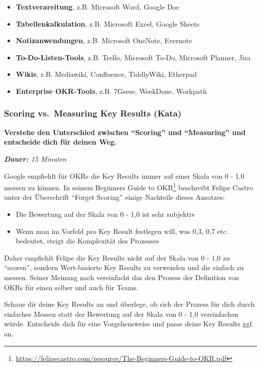 \documentclass[
  ngerman,
  paper=a4,
,captions=tableheading
]{scrartcl}
\DeclareRobustCommand{\href}[2]{#2\footnote{\url{#1}}}
\providecommand{\tightlist}{%
  \setlength{\itemsep}{0pt}\setlength{\parskip}{0pt}}
\begin{document}
\begin{itemize}
\tightlist
\item
  \textbf{Textverareitung}, z.B. Microsoft Word, Google Doc
\item
  \textbf{Tabellenkalkulation}, z.B. Microsoft Excel, Google Sheets
\item
  \textbf{Notizanwendungen}, z.B. Microsoft OneNote, Evernote
\item
  \textbf{To-Do-Listen-Tools}, z.B. Trello, Microsoft To-Do, Microsoft
  Planner, Jira
\item
  \textbf{Wikis}, z.B. Mediawiki, Confluence, TiddlyWiki, Etherpad
\item
  \textbf{Enterprise OKR-Tools}, z.B. 7Geese, WeekDone, Workpath
\end{itemize}

\hypertarget{scoring-vs.-measuring-key-results-kata}{%
\subsubsection{Scoring vs.~Measuring Key Results
(Kata)}\label{scoring-vs.-measuring-key-results-kata}}

\textbf{Verstehe den Unterschied zwischen ``Scoring'' und ``Measuring''
und entscheide dich für deinen Weg.}

\emph{\textbf{Dauer:} 15 Minuten}

Google empfiehlt für OKRs die Key Results immer auf einer Skala von 0 -
1,0 messen zu können. In seinem
\href{https://felipecastro.com/resource/The-Beginners-Guide-to-OKR.pdf}{Beginners
Guide to OKR} beschreibt Felipe Castro unter der Überschrift ``Forget
Scoring'' einige Nachteile dieses Ansatzes:

\begin{itemize}
\tightlist
\item
  Die Bewertung auf der Skala von 0 - 1,0 ist sehr subjektiv
\item
  Wenn man im Vorfeld pro Key Result festlegen will, was 0,3, 0,7 etc.
  bedeutet, steigt die Komplexität des Prozesses
\end{itemize}

Daher empfiehlt Felipe die Key Results nicht auf der Skala von 0 - 1,0
zu ``scoren'', sondern Wert-basierte Key Results zu verwenden und die
einfach zu messen. Seiner Meinung nach vereinfacht das den Prozess der
Definition von OKRs für einen selber und auch für Teams.

Schaue dir deine Key Results an und überlege, ob sich der Prozess für
dich durch einfaches Messen statt der Bewertung auf der Skala von 0 -
1,0 vereinfachen würde. Entscheide dich für eine Vorgehensweise und
passe deine Key Results ggf. an.
\end{document}

